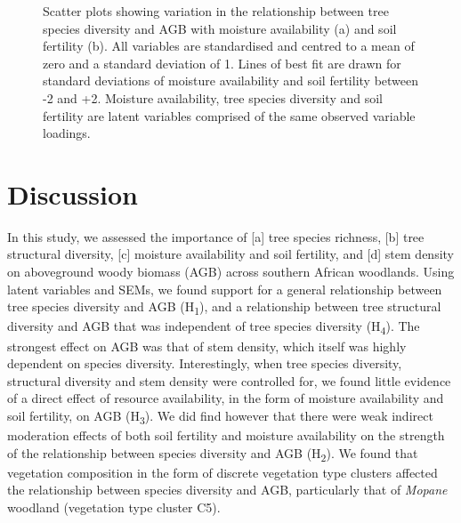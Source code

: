 \documentclass[11pt,a4paper]{article}
\begin{document}
\begin{figure}[H]
\centering
	\caption{Scatter plots showing variation in the relationship between tree species diversity and AGB with moisture availability (a) and soil fertility (b). All variables are standardised and centred to a mean of zero and a standard deviation of 1. Lines of best fit are drawn for standard deviations of moisture availability and soil fertility between -2 and +2. Moisture availability, tree species diversity and soil fertility are latent variables comprised of the same observed variable loadings.}
	\label{int_plots}
\end{figure}

\section{Discussion}


In this study, we assessed the importance of [a] tree species richness, [b] tree structural diversity, [c] moisture availability and soil fertility, and [d] stem density on aboveground woody biomass (AGB) across southern African woodlands. Using latent variables and SEMs, we found support for a general relationship between tree species diversity and AGB (H\textsubscript{1}), and a relationship between tree structural diversity and AGB that was independent of tree species diversity (H\textsubscript{4}). The strongest effect on AGB was that of stem density, which itself was highly dependent on species diversity. Interestingly, when tree species diversity, structural diversity and stem density were controlled for, we found little evidence of a direct effect of resource availability, in the form of moisture availability and soil fertility, on AGB (H\textsubscript{3}). We did find however that there were weak indirect moderation effects of both soil fertility and moisture availability on the strength of the relationship between species diversity and AGB (H\textsubscript{2}). We found that vegetation composition in the form of discrete vegetation type clusters affected the relationship between species diversity and AGB, particularly that of \textit{Mopane} woodland (vegetation type cluster C5).
\end{document}
